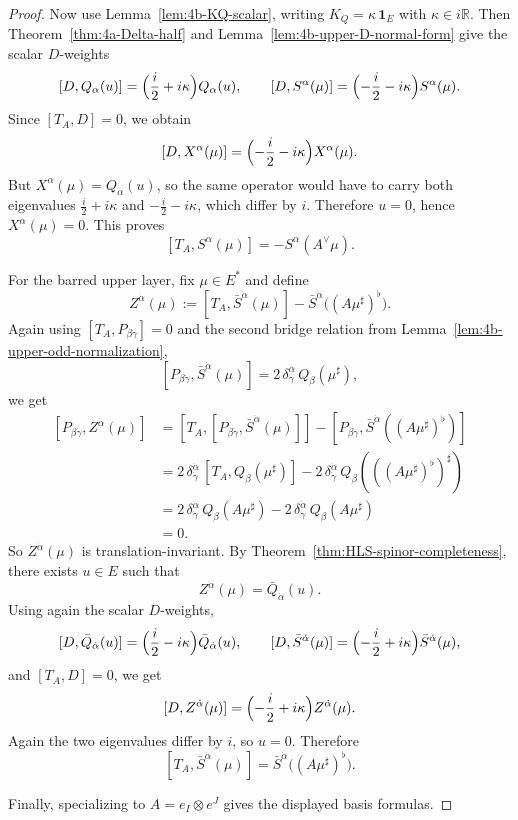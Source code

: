 \begin{proof}
Now use Lemma~\ref{lem:4b-KQ-scalar}, writing \(K_Q=\kappa\,\mathbf 1_E\) with
\(\kappa\in i\mathbb R\). Then
Theorem~\ref{thm:4a-Delta-half} and
Lemma~\ref{lem:4b-upper-D-normal-form} give the scalar \(D\)-weights
\[
[D,Q_\alpha(u)]
=
\Bigl(\frac{i}{2}+i\kappa\Bigr)Q_\alpha(u),
\qquad
[D,S^\alpha(\mu)]
=
\Bigl(-\frac{i}{2}-i\kappa\Bigr)S^\alpha(\mu).
\]
Since \([T_A,D]=0\), we obtain
\[
[D,X^\alpha(\mu)]
=
\Bigl(-\frac{i}{2}-i\kappa\Bigr)X^\alpha(\mu).
\]
But \(X^\alpha(\mu)=Q_\alpha(u)\), so the same operator would have to carry both
eigenvalues \(\frac{i}{2}+i\kappa\) and \(-\frac{i}{2}-i\kappa\), which differ by
\(i\). Therefore \(u=0\), hence \(X^\alpha(\mu)=0\). This proves
\[
[T_A,S^\alpha(\mu)]
=
-S^\alpha(A^\vee\mu).
\]

For the barred upper layer, fix \(\mu\in E^*\) and define
\[
Z^{\dot\alpha}(\mu)
:=
[T_A,\bar S^{\dot\alpha}(\mu)]
-\bar S^{\dot\alpha}\bigl((A\mu^\sharp)^\flat\bigr).
\]
Again using \([T_A,P_{\beta\dot\gamma}]=0\) and the second bridge relation from
Lemma~\ref{lem:4b-upper-odd-normalization},
\[
[P_{\beta\dot\gamma},\bar S^{\dot\alpha}(\mu)]
=
2\,\delta_{\dot\gamma}^{\dot\alpha}\,Q_\beta(\mu^\sharp),
\]
we get
\[
\begin{aligned}
[P_{\beta\dot\gamma},Z^{\dot\alpha}(\mu)]
&=
[T_A,[P_{\beta\dot\gamma},\bar S^{\dot\alpha}(\mu)]]
-
[P_{\beta\dot\gamma},
\bar S^{\dot\alpha}((A\mu^\sharp)^\flat)] \\
&=
2\,\delta_{\dot\gamma}^{\dot\alpha}\,[T_A,Q_\beta(\mu^\sharp)]
-
2\,\delta_{\dot\gamma}^{\dot\alpha}\,Q_\beta(((A\mu^\sharp)^\flat)^\sharp) \\
&=
2\,\delta_{\dot\gamma}^{\dot\alpha}\,Q_\beta(A\mu^\sharp)
-
2\,\delta_{\dot\gamma}^{\dot\alpha}\,Q_\beta(A\mu^\sharp) \\
&=
0.
\end{aligned}
\]
So \(Z^{\dot\alpha}(\mu)\) is translation-invariant. By
Theorem~\ref{thm:HLS-spinor-completeness}, there exists \(u\in E\) such that
\[
Z^{\dot\alpha}(\mu)=\bar Q_{\dot\alpha}(u).
\]
Using again the scalar \(D\)-weights,
\[
[D,\bar Q_{\dot\alpha}(u)]
=
\Bigl(\frac{i}{2}-i\kappa\Bigr)\bar Q_{\dot\alpha}(u),
\qquad
[D,\bar S^{\dot\alpha}(\mu)]
=
\Bigl(-\frac{i}{2}+i\kappa\Bigr)\bar S^{\dot\alpha}(\mu),
\]
and \([T_A,D]=0\), we get
\[
[D,Z^{\dot\alpha}(\mu)]
=
\Bigl(-\frac{i}{2}+i\kappa\Bigr)Z^{\dot\alpha}(\mu).
\]
Again the two eigenvalues differ by \(i\), so \(u=0\). Therefore
\[
[T_A,\bar S^{\dot\alpha}(\mu)]
=
\bar S^{\dot\alpha}\bigl((A\mu^\sharp)^\flat\bigr).
\]

Finally, specializing to \(A=e_I\otimes e^J\) gives the displayed basis formulas.
\end{proof}

